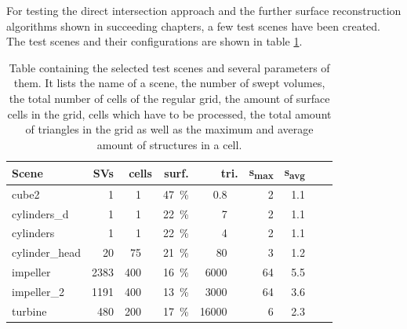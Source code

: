 For testing the direct intersection approach and the further surface reconstruction algorithms shown in succeeding chapters, a few test scenes have been created.
The test scenes and their configurations are shown in table \ref{tbl:test_scenes}.
%
\begin{table}[h]
	\centering
	\begin{tabular}{lrrrrrrrr}
		Scene          & SVs  & cells & surf. & tri.  & s\textsubscript{max} & s\textsubscript{avg} \\
		\midrule
		cube2          &    1 & \SI{  1}{\kilo\nothing} & \SI{47}{\percent} & \SI{  0.8}{\kilo\nothing} &  2 & 1.1 \\
		cylinders\_d   &    1 & \SI{  1}{\kilo\nothing} & \SI{22}{\percent} & \SI{    7}{\kilo\nothing} &  2 & 1.1 \\
		cylinders      &    1 & \SI{  1}{\kilo\nothing} & \SI{22}{\percent} & \SI{    4}{\kilo\nothing} &  2 & 1.1 \\
		cylinder\_head &   20 & \SI{ 75}{\kilo\nothing} & \SI{21}{\percent} & \SI{   80}{\kilo\nothing} &  3 & 1.2 \\
		impeller       & 2383 & \SI{400}{\kilo\nothing} & \SI{16}{\percent} & \SI{ 6000}{\kilo\nothing} & 64 & 5.5 \\
		impeller\_2    & 1191 & \SI{400}{\kilo\nothing} & \SI{13}{\percent} & \SI{ 3000}{\kilo\nothing} & 64 & 3.6 \\
		turbine        &  480 & \SI{200}{\kilo\nothing} & \SI{17}{\percent} & \SI{16000}{\kilo\nothing} &  6 & 2.3 \\
	\end{tabular}
	\caption{
		Table containing the selected test scenes and several parameters of them.
		It lists the name of a scene, the number of swept volumes, the total number of cells of the regular grid, the amount of surface cells in the grid, \ie cells which have to be processed, the total amount of triangles in the grid as well as the maximum and average amount of structures in a cell.
	}
	\label{tbl:test_scenes}
\end{table}

